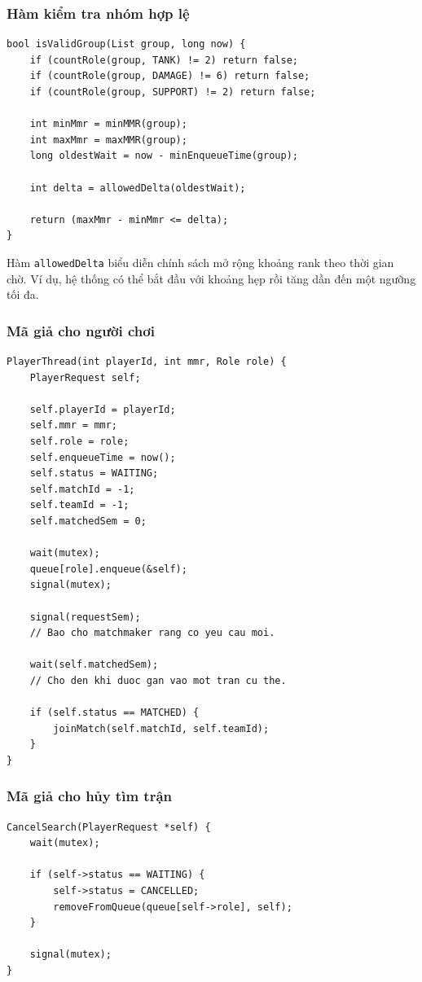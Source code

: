 \subsubsection*{Hàm kiểm tra nhóm hợp lệ}

\begin{lstlisting}
bool isValidGroup(List group, long now) {
    if (countRole(group, TANK) != 2) return false;
    if (countRole(group, DAMAGE) != 6) return false;
    if (countRole(group, SUPPORT) != 2) return false;

    int minMmr = minMMR(group);
    int maxMmr = maxMMR(group);
    long oldestWait = now - minEnqueueTime(group);

    int delta = allowedDelta(oldestWait);

    return (maxMmr - minMmr <= delta);
}
\end{lstlisting}

Hàm \texttt{allowedDelta} biểu diễn chính sách mở rộng khoảng rank theo thời
gian chờ. Ví dụ, hệ thống có thể bắt đầu với khoảng hẹp rồi tăng dần đến một
ngưỡng tối đa.

\subsubsection*{Mã giả cho người chơi}

\begin{lstlisting}
PlayerThread(int playerId, int mmr, Role role) {
    PlayerRequest self;

    self.playerId = playerId;
    self.mmr = mmr;
    self.role = role;
    self.enqueueTime = now();
    self.status = WAITING;
    self.matchId = -1;
    self.teamId = -1;
    self.matchedSem = 0;

    wait(mutex);
    queue[role].enqueue(&self);
    signal(mutex);

    signal(requestSem);
    // Bao cho matchmaker rang co yeu cau moi.

    wait(self.matchedSem);
    // Cho den khi duoc gan vao mot tran cu the.

    if (self.status == MATCHED) {
        joinMatch(self.matchId, self.teamId);
    }
}
\end{lstlisting}

\subsubsection*{Mã giả cho hủy tìm trận}

\begin{lstlisting}
CancelSearch(PlayerRequest *self) {
    wait(mutex);

    if (self->status == WAITING) {
        self->status = CANCELLED;
        removeFromQueue(queue[self->role], self);
    }

    signal(mutex);
}
\end{lstlisting}

